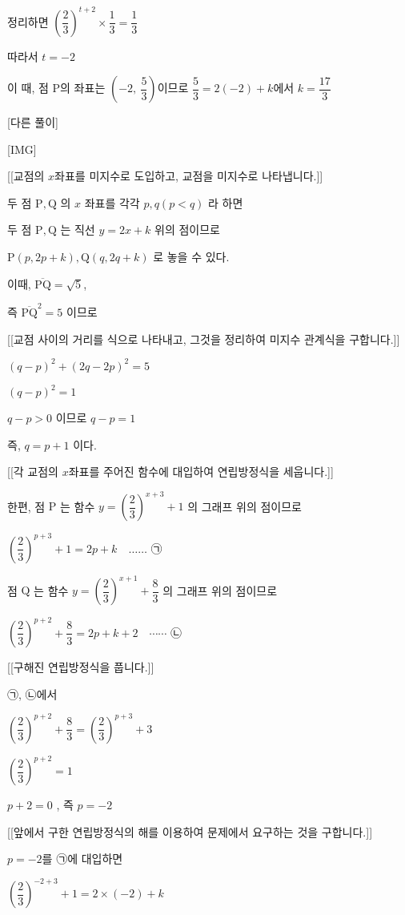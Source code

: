 \documentclass{oblivoir}
\begin{document}
정리하면 $\left(\dfrac{2}{3}\right)^{t+2}\times\dfrac{1}{3}=\dfrac{1}{3}$

따라서 $t=-2$

이 때, 점 $\mathrm{P}$의 좌표는 $\left(-2,\:\dfrac{5}{3}\right)$이므로 $\dfrac{5}{3}= 2(-2)+k$에서 $k=\dfrac{17}{3}$

[다른 풀이]

[IMG]

[[교점의 $x$좌표를 미지수로 도입하고, 교점을 미지수로 나타냅니다.]]

두 점 $\mathrm{P}, \mathrm{Q}$ 의 $x$ 좌표를 각각 $p, q(p< q)$ 라 하면

두 점 $\mathrm{P}, \mathrm{Q}$ 는 직선 $y=2 x+k$ 위의 점이므로

$\mathrm{P}(p, 2 p+k), \mathrm{Q}(q, 2 q+k)$ 로 놓을 수 있다.

이때, $\overline{\mathrm{PQ}}=\sqrt{5}$,

즉 $\overline{\mathrm{PQ}}^{2}=5$ 이므로

[[교점 사이의 거리를 식으로 나타내고, 그것을 정리하여 미지수 관계식을 구합니다.]]

$(q-p)^{2}+(2 q-2 p)^{2}=5$

$(q-p)^{2}=1$

$q-p>0$ 이므로 $q-p=1$

즉, $q=p+1$ 이다.

[[각 교점의 $x$좌표를 주어진 함수에 대입하여 연립방정식을 세웁니다.]]

한편, 점 $\mathrm{P}$ 는 함수 $y=\left(\dfrac{2}{3}\right)^{x+3}+1$ 의 그래프 위의 점이므로

$\left(\dfrac{2}{3}\right)^{p+3}+1=2 p+k \quad \ldots \ldots$ ㉠

점 $\mathrm{Q}$ 는 함수 $y=\left(\dfrac{2}{3}\right)^{x+1}+\dfrac{8}{3}$ 의 그래프
위의 점이므로

$\left(\dfrac{2}{3}\right)^{p+2}+\dfrac{8}{3}=2 p+k+2 \quad \cdots \cdots$ ㉡

[[구해진 연립방정식을 풉니다.]]

㉠, ㉡에서

$\left(\dfrac{2}{3}\right)^{p+2}+\dfrac{8}{3}=\left(\dfrac{2}{3}\right)^{p+3}+3$

$\left(\dfrac{2}{3}\right)^{p+2}=1$

$p+2=0$ , 즉 $p=-2$

[[앞에서 구한 연립방정식의 해를 이용하여 문제에서 요구하는 것을 구합니다.]]

$p=-2$를 ㉠에 대입하면

$\left(\dfrac{2}{3}\right)^{-2+3}+1=2 \times(-2)+k$
\end{document}
